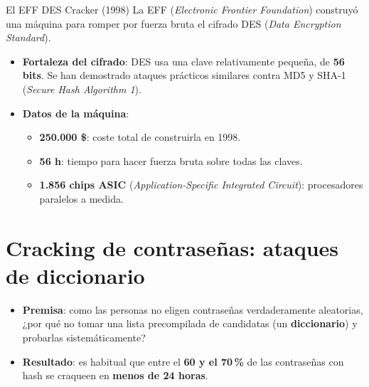 \documentclass[11pt,a4paper]{report}
\newcommand{\destacar}[1]{\textcolor{red!70!black}{\textbf{#1}}}
\begin{document}
\begin{ejemplo}{El EFF DES Cracker (1998)}
La EFF (\emph{Electronic Frontier Foundation}) construyó una máquina para romper por fuerza bruta el cifrado DES (\emph{Data Encryption Standard}).
\begin{itemize}
  \item \textbf{Fortaleza del cifrado}: DES usa una clave relativamente pequeña, de \textbf{56 bits}. Se han demostrado ataques prácticos similares contra MD5 y SHA-1 (\emph{Secure Hash Algorithm 1}).
  \item \textbf{Datos de la máquina}:
    \begin{itemize}
      \item \textbf{250.000 \$}: coste total de construirla en 1998.
      \item \textbf{56 h}: tiempo para hacer fuerza bruta sobre todas las claves.
      \item \textbf{1.856 chips ASIC} (\emph{Application-Specific Integrated Circuit}): procesadores paralelos a medida.
    \end{itemize}
\end{itemize}
\end{ejemplo}
 
\section{Cracking de contraseñas: ataques de diccionario}
 
\begin{itemize}
  \item \textbf{Premisa}: como las personas no eligen contraseñas verdaderamente aleatorias, ¿por qué no tomar una lista precompilada de candidatas (un \textbf{diccionario}) y probarlas sistemáticamente?
  \item \textbf{Resultado}: es habitual que entre el \destacar{60 y el 70\,\%} de las contraseñas con hash se craqueen en \textbf{menos de 24 horas}.
\end{itemize}
 
\begin{center}
\end{center}
 
\end{document}
